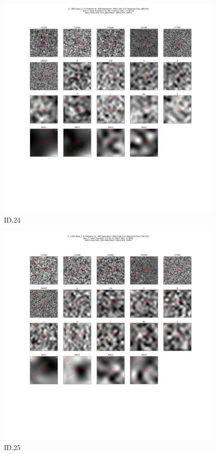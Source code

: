 \begin{figure}[tbp]
\centering \includegraphics[width=120mm]{Matched/ASPECS_Cutout_24.png}
\caption{ID.24}
\label{fig:Match_Three}
\end{figure}

\begin{figure}[tbp]
\centering \includegraphics[width=120mm]{Matched/ASPECS_Cutout_25.png}
\caption{ID.25}
\label{fig:Match_Three}
\end{figure}

